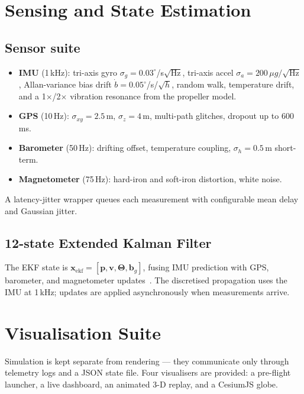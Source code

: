 \documentclass[a4paper, conference]{IEEEtran}
\begin{document}
\section{Sensing and State Estimation}\label{sec:sense}
\subsection{Sensor suite}
\begin{itemize}
\item \textbf{IMU} (1\,kHz): tri-axis gyro $\sigma_g=0.03^\circ$/s$\sqrt{\text{Hz}}$,
       tri-axis accel $\sigma_a=200\,\mu g/\sqrt{\text{Hz}}$,
       Allan-variance bias drift $\dot{b}=0.05^\circ$/s/$\sqrt{h}$,
       random walk, temperature drift, and a 1$\times$/2$\times$ vibration
       resonance from the propeller model.
\item \textbf{GPS} (10\,Hz): $\sigma_{xy}=2.5$\,m, $\sigma_z=4$\,m,
       multi-path glitches, dropout up to 600\,ms.
\item \textbf{Barometer} (50\,Hz): drifting offset, temperature
       coupling, $\sigma_h=0.5$\,m short-term.
\item \textbf{Magnetometer} (75\,Hz): hard-iron and soft-iron
       distortion, white noise.
\end{itemize}
A latency-jitter wrapper queues each measurement with configurable
mean delay and Gaussian jitter.

\subsection{12-state Extended Kalman Filter}
The EKF state is
\(
\mathbf{x}_{\text{ekf}} = [\mathbf{p}, \mathbf{v}, \boldsymbol{\Theta}, \mathbf{b}_g]
\),
fusing IMU prediction with GPS, barometer, and magnetometer
updates~\cite{groves}. The discretised propagation uses the IMU at 1\,kHz; updates are
applied asynchronously when measurements arrive.

\section{Visualisation Suite}\label{sec:vis}
Simulation is kept separate from rendering --- they communicate only
through telemetry logs and a JSON state file. Four visualisers are
provided: a pre-flight launcher, a live dashboard, an animated 3-D
replay, and a CesiumJS globe.
\end{document}
